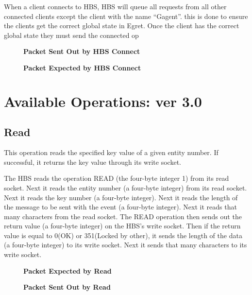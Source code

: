 When a client connects to HBS, HBS will queue all requests from all other
connected clients except the client with the name ``Gagent''.  this is done
to ensure the clients get the correct global state in Egret.  Once the
client has the correct global state they must send the connected op


\begin{figure}[htb]
  \centerline{}
  \caption{{\bf Packet Sent Out by HBS Connect}}
  \label{fig:hb_connect1}
\end{figure}

\begin{figure}[htb]
  \centerline{}
  \caption{{\bf Packet Expected by HBS Connect}}
  \label{fig:hb_connect2}
\end{figure}


\newpage
\section{Available Operations: ver 3.0}
\label{sec:operations}

\subsection{Read}

This operation reads the specified key value of a given entity number.  If
successful, it returns the key value through its write socket.  

The HBS reads the operation READ (the four-byte integer 1) from its read
socket.  Next it reads the entity number (a four-byte integer) from its
read socket.  Next it reads the key number (a four-byte integer).  
Next it reads the length of the message to be sent with the event (a
four-byte integer).  Next it reads that many characters from the read
socket.  The READ operation then sends out the return value (a four-byte
integer) on the HBS's write socket.  Then if the return value is equal to
0(OK) or 351(Locked by other), it sends the length of the data (a four-byte
integer) to its write socket.  Next it sends that many characters to its
write socket.

\begin{figure}[htb]
  \centerline{}
  \caption{{\bf Packet Expected by Read}}
  \label{fig:read1}
\end{figure}

\begin{figure}[htb]
  \centerline{}
  \caption{{\bf Packet Sent Out by Read}}
  \label{fig:read2}
\end{figure}



